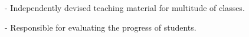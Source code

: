 \documentclass{article}
\begin{document}
- Independently devised teaching material for multitude of classes.

- Responsible for evaluating the progress of students.




\end{document}
